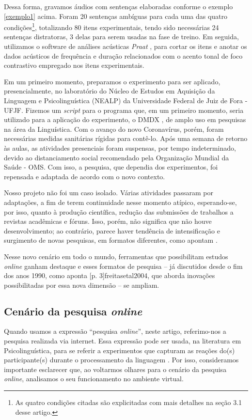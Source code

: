 \documentclass{textolivre}
\begin{document}
Dessa forma, gravamos áudios com sentenças elaboradas conforme o exemplo \ref{exemplo1} acima. Foram 20 sentenças ambíguas para cada uma das quatro condições\footnote{As quatro condições citadas são explicitadas com mais detalhes na seção 3.1 desse artigo.}, totalizando 80 itens experimentais, tendo sido necessárias 24 sentenças distratoras, 3 delas para serem usadas na fase de treino. Em seguida, utilizamos o software de análises acústicas \emph{Praat} \cite{boersma2018}, para cortar os itens e anotar os dados acústicos de frequência e duração relacionados com o acento tonal de foco contrastivo empregado nos itens experimentais.

Em um primeiro momento, preparamos o experimento para ser aplicado, presencialmente, no laboratório do Núcleo de Estudos em Aquisição da Linguagem e Psicolinguística (NEALP) da Universidade Federal de Juiz de Fora - UFJF. Fizemos um \emph{script} para o programa que, em um primeiro momento, seria utilizado para a aplicação do experimento, o DMDX \cite{forster2002}, de amplo uso em pesquisas na área da Linguística. Com o avanço do novo Coronavírus, porém, foram necessárias medidas sanitárias rígidas para contê-lo. Após uma semana de retorno às aulas, as atividades presenciais foram suspensas, por tempo indeterminado, devido ao distanciamento social recomendado pela Organização Mundial da Saúde - OMS. Com isso, a pesquisa, que dependia dos experimentos, foi repensada e adaptada de acordo com o novo contexto.

Nosso projeto não foi um caso isolado. Várias atividades passaram por adaptações, a fim de terem continuidade nesse momento atípico, esperando-se, por isso, quanto à produção científica, redução das submissões de trabalhos a revistas acadêmicas e fóruns. Isso, porém, não significa que não houve desenvolvimento; ao contrário, parece haver tendência de intensificação e surgimento de novas pesquisas, em formatos diferentes, como apontam \textcite[p. 82]{tonelli2020}.

Nesse novo cenário em todo o mundo, ferramentas que possibilitam estudos \textit{online} ganham destaque e esses formatos de pesquisa – já discutidos desde o fim dos anos 1990, como aponta [p. 3]{freitasetal2004}, que aborda inovações possibilitadas por essa nova dimensão – se ampliam.

\subsection{Cenário da pesquisa \textit{online}}
Quando usamos a expressão “pesquisa \textit{online}”, neste artigo, referimo-nos a pesquisa realizada via internet. Essa expressão pode ser usada, na literatura em Psicolinguística, para se referir a experimentos que capturam as reações do(s) participante(s) durante o processamento da linguagem \cite{leitao2012}. Por isso, consideramos importante esclarecer que, ao voltarmos olhares para o cenário da pesquisa \textit{online}, analisamos o seu funcionamento no ambiente virtual.
\end{document}
